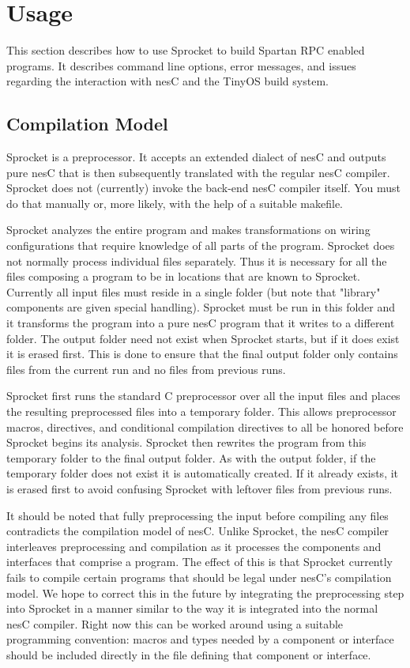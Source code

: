 \section{Usage}

This section describes how to use Sprocket to build Spartan RPC enabled programs. It describes
command line options, error messages, and issues regarding the interaction with nesC and the
TinyOS build system.

\subsection{Compilation Model}

Sprocket is a preprocessor. It accepts an extended dialect of nesC and outputs pure nesC that is
then subsequently translated with the regular nesC compiler. Sprocket does not (currently)
invoke the back-end nesC compiler itself. You must do that manually or, more likely, with the
help of a suitable makefile.

Sprocket analyzes the entire program and makes transformations on wiring configurations that
require knowledge of all parts of the program. Sprocket does not normally process individual
files separately. Thus it is necessary for all the files composing a program to be in locations
that are known to Sprocket. Currently all input files must reside in a single folder (but note
that "library" components are given special handling). Sprocket must be run in this folder and
it transforms the program into a pure nesC program that it writes to a different folder. The
output folder need not exist when Sprocket starts, but if it does exist it is erased first. This
is done to ensure that the final output folder only contains files from the current run and no
files from previous runs.

Sprocket first runs the standard C preprocessor over all the input files and places the
resulting preprocessed files into a temporary folder. This allows preprocessor macros,
 directives, and conditional compilation directives to all be honored before
Sprocket begins its analysis. Sprocket then rewrites the program from this temporary folder to
the final output folder. As with the output folder, if the temporary folder does not exist it is
automatically created. If it already exists, it is erased first to avoid confusing Sprocket with
leftover files from previous runs.

It should be noted that fully preprocessing the input before compiling any files contradicts the
compilation model of nesC. Unlike Sprocket, the nesC compiler interleaves preprocessing and
compilation as it processes the components and interfaces that comprise a program. The effect of
this is that Sprocket currently fails to compile certain programs that should be legal under
nesC's compilation model. We hope to correct this in the future by integrating the preprocessing
step into Sprocket in a manner similar to the way it is integrated into the normal nesC
compiler. Right now this can be worked around using a suitable programming convention: macros
and types needed by a component or interface should be included directly in the file defining
that component or interface.

